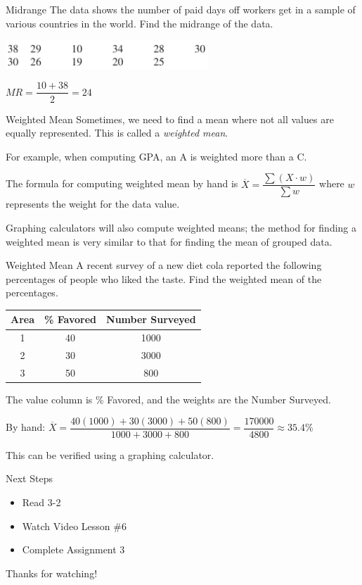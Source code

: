 \documentclass[t, aspectratio=169]{beamer}
\newcommand{\?}{\stackrel{?}{=}}
\begin{document}
	\begin{frame}{Midrange}
		The data shows the number of paid days off workers get in a sample of various countries in the world. Find the midrange of the data.
		
		\includegraphics[width=3in]{pto-data.png} \pause
		
		$MR = \dfrac{10 + 38}{2} = 24$
	\end{frame}

	\begin{frame}{Weighted Mean}
		Sometimes, we need to find a mean where not all values are equally represented. This is called a \textit{weighted mean}. \pause
		
		For example, when computing GPA, an A is weighted more than a C. \pause
		
		The formula for computing weighted mean by hand is $\overline{X} = \dfrac{\sum (X \cdot w)}{\sum w}$ where $w$ represents the weight for the data value. \pause
		
		Graphing calculators will also compute weighted means; the method for finding a weighted mean is very similar to that for finding the mean of grouped data.
	\end{frame}

	\begin{frame}{Weighted Mean}
		A recent survey of a new diet cola reported the following percentages of people who liked the taste. Find the weighted mean of the percentages.
		
		\begin{tabular}{ccc}
			Area & \% Favored & Number Surveyed \\ \hline
			1 & 40 & 1000 \\
			2 & 30 & 3000 \\
			3 & 50 & 800
		\end{tabular} \pause
	
		The value column is \% Favored, and the weights are the Number Surveyed.
		
		By hand: $\overline{X} = \dfrac{40(1000) + 30(3000) + 50(800)}{1000 + 3000 + 800} = \dfrac{170000}{4800} \approx 35.4\%$ \pause
		
		This can be verified using a graphing calculator.
	\end{frame}

	\begin{frame}{Next Steps}
		\begin{itemize}
			\item Read 3-2
			\item Watch Video Lesson \#6
			\item Complete Assignment 3
		\end{itemize}
	
		\vfill
		
		Thanks for watching!
	\end{frame}
	
\end{document}
